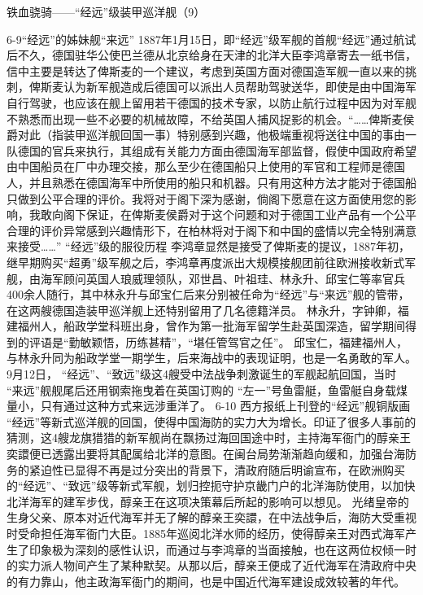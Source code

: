 \documentclass[12pt,UTF8]{ctexbook}
\begin{document}
铁血骁骑——“经远”级装甲巡洋舰（9）

6-9“经远”的姊妹舰“来远”
1887年1月15日，即“经远”级军舰的首舰“经远”通过航试后不久，德国驻华公使巴兰德从北京给身在天津的北洋大臣李鸿章寄去一纸书信，信中主要是转达了俾斯麦的一个建议，考虑到英国方面对德国造军舰一直以来的挑刺，俾斯麦认为新军舰造成后德国可以派出人员帮助驾驶送华，即使是由中国海军自行驾驶，也应该在舰上留用若干德国的技术专家，以防止航行过程中因为对军舰不熟悉而出现一些不必要的机械故障，不给英国人捕风捉影的机会。“……俾斯麦侯爵对此（指装甲巡洋舰回国一事）特别感到兴趣，他极端重视将送往中国的事由一队德国的官兵来执行，其组成有关能力方面由德国海军部监督，假使中国政府希望由中国船员在厂中办理交接，那么至少在德国船只上使用的军官和工程师是德国人，并且熟悉在德国海军中所使用的船只和机器。只有用这种方法才能对于德国船只做到公平合理的评价。我将对于阁下深为感谢，倘阁下愿意在这方面使用您的影响，我敢向阁下保证，在俾斯麦侯爵对于这个问题和对于德国工业产品有一个公平合理的评价异常感到兴趣情形下，在柏林将对于阁下和中国的盛情以完全特别满意来接受……”
“经远”级的服役历程
李鸿章显然是接受了俾斯麦的提议，1887年初，继早期购买“超勇”级军舰之后，李鸿章再度派出大规模接舰团前往欧洲接收新式军舰，由海军顾问英国人琅威理领队，邓世昌、叶祖珪、林永升、邱宝仁等率官兵400余人随行，其中林永升与邱宝仁后来分别被任命为“经远”与“来远”舰的管带，在这两艘德国造装甲巡洋舰上还特别留用了几名德籍洋员。
林永升，字钟卿，福建福州人，船政学堂科班出身，曾作为第一批海军留学生赴英国深造，留学期间得到的评语是“勤敏颖悟，历练甚精”，“堪任管驾官之任”。
邱宝仁，福建福州人，与林永升同为船政学堂一期学生，后来海战中的表现证明，也是一名勇敢的军人。
9月12日， “经远”、“致远”级这4艘受中法战争刺激诞生的军舰起航回国，当时 “来远”舰舰尾后还用钢索拖曳着在英国订购的 “左一”号鱼雷艇，鱼雷艇自身载煤量小，只有通过这种方式来远涉重洋了。
6-10 西方报纸上刊登的“经远”舰铜版画
“经远”等新式巡洋舰的回国，使得中国海防的实力大为增长。印证了很多人事前的猜测，这4艘龙旗猎猎的新军舰尚在飘扬过海回国途中时，主持海军衙门的醇亲王奕譞便已透露出要将其配属给北洋的意图。在闽台局势渐渐趋向缓和，加强台海防务的紧迫性已显得不再是过分突出的背景下，清政府随后明谕宣布，在欧洲购买的“经远”、“致远”级等新式军舰，划归控扼守护京畿门户的北洋海防使用，以加快北洋海军的建军步伐，醇亲王在这项决策幕后所起的影响可以想见。
光绪皇帝的生身父亲、原本对近代海军并无了解的醇亲王奕譞，在中法战争后，海防大受重视时受命担任海军衙门大臣。1885年巡阅北洋水师的经历，使得醇亲王对西式海军产生了印象极为深刻的感性认识，而通过与李鸿章的当面接触，也在这两位权倾一时的实力派人物间产生了某种默契。从那以后，醇亲王便成了近代海军在清政府中央的有力靠山，他主政海军衙门的期间，也是中国近代海军建设成效较著的年代。
\end{document}
